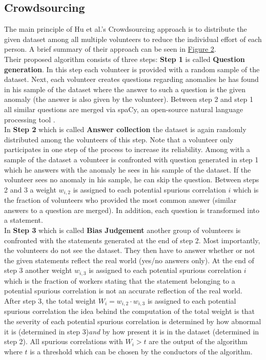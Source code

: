\documentclass{article}
\begin{document}
\subsection{Crowdsourcing}
The main principle of Hu et al.'s Crowdsourcing approach \cite{10.1145/3366423.3380063} is to distribute the given dataset
among all multiple volunteers to reduce the individual effort of each person. A brief summary of their approach
can be seen in \hyperref[fig:crowdsourcing]{Figure 2}. \\
Their proposed algorithm consists of three steps: \textbf{Step 1} is called \textbf{Question generation}.
In this step each volunteer is provided with a random sample of the dataset. Next, each volunteer creates questions regarding
anomalies he has found in his sample of the dataset where the answer to such a question is the given anomaly
(the answer is also given by the volunteer). Between step 2 and step 1 all similar questions are merged via spaCy,
an open-source natural language processing tool \cite{spaCy}. \\
In \textbf{Step 2} which is called \textbf{Answer collection} the dataset is again randomly distributed among the volunteers
of this step. Note that a volunteer only participates in one step of the process to increase its reliability.
Among with a sample of the dataset a volunteer is confronted with question generated in step 1 which he answers with the
anomaly he sees in his sample of the dataset. If the volunteer sees no anomaly in his sample, he can skip the question.
Between steps 2 and 3 a weight $w_{i,2}$ is assigned to each potential spurious correlation $i$ which is the fraction of
volunteers who provided the most common answer (similar answers to a question are merged).
In addition, each question is transformed into a statement. \\
In \textbf{Step 3} which is called \textbf{Bias Judgement} another group of volunteers is confronted with the statements
generated at the end of step 2. Most importantly, the volunteers do not see the dataset.
They then have to answer whether or not the given statements reflect the real world (yes/no answers only).
At the end of step 3 another weight $w_{i,3}$ is assigned to each potential spurious correlation $i$ which is the fraction
of workers stating that the statement belonging to a potential spurious correlation is not an accurate
reflection of the real world. \\
After step 3, the total weight $W_{i}=w_{i,2} \cdot w_{i,3}$ is assigned to each potential spurious correlation the idea
behind the computation of the total weight is that the severity of each potential spurious correlation is determined by
how abnormal it is (determined in step 3)\textit{and} by how present it is in the dataset (determined in step 2).
All spurious correlations with $W_i > t$ are the output of the algorithm where $t$ is a threshold which can be chosen
by the conductors of the algorithm. \\
\end{document}

